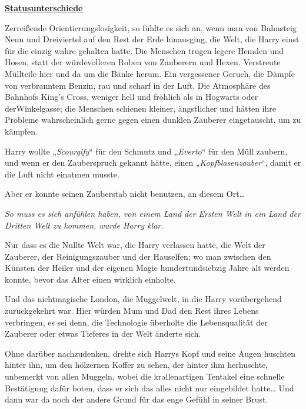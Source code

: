 

\hypertarget{statusunterschiede}{%

\textbf{\uline{Statusunterschiede}}

Zerreißende Orientierungslosigkeit, so fühlte es sich an, wenn man von Bahnsteig Neun und Dreiviertel auf den Rest der Erde hinausging, die Welt, die Harry einst für die einzig wahre gehalten hatte. Die Menschen trugen legere Hemden und Hosen, statt der würdevolleren Roben von Zauberern und Hexen. Verstreute Müllteile hier und da um die Bänke herum. Ein vergessener Geruch, die Dämpfe von verbranntem Benzin, rau und scharf in der Luft. Die Atmosphäre des Bahnhofs King's Cross, weniger hell und fröhlich als in Hogwarts oder derWinkelgasse; die Menschen schienen kleiner, ängstlicher und hätten ihre Probleme wahrscheinlich gerne gegen einen dunklen Zauberer eingetauscht, um zu kämpfen.

Harry wollte „\emph{Scourgify}“ für den Schmutz und „\emph{Everto}“ für den Müll zaubern, und wenn er den Zauberspruch gekannt hätte, einen „\emph{Kopfblasenzauber}“, damit er die Luft nicht einatmen musste.

Aber er konnte seinen Zauberstab nicht benutzen, an diesem Ort…

\emph{So muss es sich anfühlen haben, von einem Land der Ersten Welt in ein Land der Dritten Welt zu kommen, wurde Harry klar.}

Nur dass es die Nullte Welt war, die Harry verlassen hatte, die Welt der Zauberer, der Reinigungszauber und der Hauselfen; wo man zwischen den Künsten der Heiler und der eigenen Magie hundertundsiebzig Jahre alt werden konnte, bevor das Alter einen wirklich einholte.

Und das nichtmagische London, die Muggelwelt, in die Harry vorübergehend zurückgekehrt war. Hier würden Mum und Dad den Rest ihres Lebens verbringen, es sei denn, die Technologie überholte die Lebensqualität der Zauberer oder etwas Tieferes in der Welt änderte sich.

Ohne darüber nachzudenken, drehte sich Harrys Kopf und seine Augen huschten hinter ihn, um den hölzernen Koffer zu sehen, der hinter ihm herhuschte, unbemerkt von allen Muggeln, wobei die krallenartigen Tentakel eine schnelle Bestätigung dafür boten, dass er sich das alles nicht nur eingebildet hatte… Und dann war da noch der andere Grund für das enge Gefühl in seiner Brust.

}
